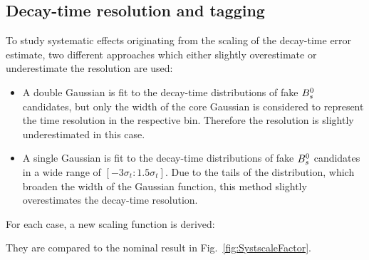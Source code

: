 \subsection{Decay-time resolution and tagging}
\label{ssec:biasSys}

To study systematic effects originating from the scaling of the decay-time error estimate, 
two different approaches which either slightly overestimate or underestimate the resolution are used:
\begin{itemize}

\item A double Gaussian is fit to the decay-time distributions of fake ${{B}^0_{s}}$ candidates, but only the width of the core Gaussian is considered to represent the time resolution in the respective bin. 
Therefore the resolution is slightly underestimated in this case.

\item A single Gaussian is fit to the decay-time distributions of fake ${{B}^0_{s}}$ candidates in a wide range of $[-3\sigma_{t} : 1.5\sigma_{t}]$. 
Due to the tails of the distribution, which broaden the width of the Gaussian function, this method slightly overestimates the decay-time resolution.   

\end{itemize}
%
For each case, a new scaling function is derived: 





%
They are compared to the nominal result in Fig.~\ref{fig:SystscaleFactor}.

